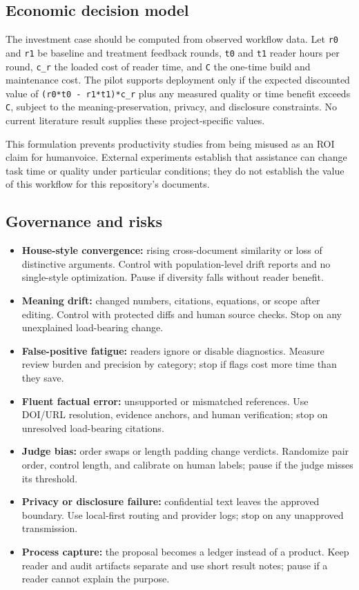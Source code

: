 \documentclass[11pt]{article}
\providecommand{\tightlist}{\setlength{\itemsep}{0pt}\setlength{\parskip}{0pt}}
\begin{document}
\hypertarget{economic-decision-model}{%
\subsection{Economic decision model}\label{economic-decision-model}}

The investment case should be computed from observed workflow data. Let \texttt{r0} and \texttt{r1} be baseline and treatment feedback rounds, \texttt{t0} and \texttt{t1} reader hours per round, \texttt{c\_r} the loaded cost of reader time, and \texttt{C} the one-time build and maintenance cost. The pilot supports deployment only if the expected discounted value of \texttt{(r0*t0\ -\ r1*t1)*c\_r} plus any measured quality or time benefit exceeds \texttt{C}, subject to the meaning-preservation, privacy, and disclosure constraints. No current literature result supplies these project-specific values.

This formulation prevents productivity studies from being misused as an ROI claim for humanvoice. External experiments establish that assistance can change task time or quality under particular conditions; they do not establish the value of this workflow for this repository's documents.

\hypertarget{governance-and-risks}{%
\subsection{Governance and risks}\label{governance-and-risks}}

\begin{itemize}
\tightlist
\item
  \textbf{House-style convergence:} rising cross-document similarity or loss of distinctive arguments. Control with population-level drift reports and no single-style optimization. Pause if diversity falls without reader benefit.
\item
  \textbf{Meaning drift:} changed numbers, citations, equations, or scope after editing. Control with protected diffs and human source checks. Stop on any unexplained load-bearing change.
\item
  \textbf{False-positive fatigue:} readers ignore or disable diagnostics. Measure review burden and precision by category; stop if flags cost more time than they save.
\item
  \textbf{Fluent factual error:} unsupported or mismatched references. Use DOI/URL resolution, evidence anchors, and human verification; stop on unresolved load-bearing citations.
\item
  \textbf{Judge bias:} order swaps or length padding change verdicts. Randomize pair order, control length, and calibrate on human labels; pause if the judge misses its threshold.
\item
  \textbf{Privacy or disclosure failure:} confidential text leaves the approved boundary. Use local-first routing and provider logs; stop on any unapproved transmission.
\item
  \textbf{Process capture:} the proposal becomes a ledger instead of a product. Keep reader and audit artifacts separate and use short result notes; pause if a reader cannot explain the purpose.
\end{itemize}
\end{document}
